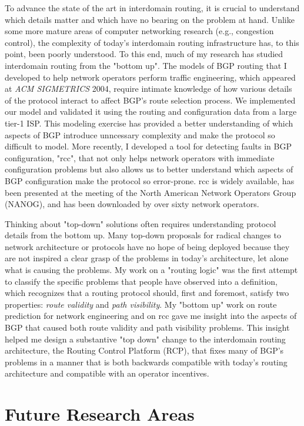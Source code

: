 \documentclass{article}
\begin{document}
To advance the state of the art in interdomain routing, it is crucial to
understand which details matter and which have no bearing on the problem
at hand.  Unlike some more mature areas of computer networking research
(e.g., congestion control), the complexity of today's interdomain
routing infrastructure has, to this point, been poorly understood.  To
this end, much of my research has studied interdomain routing from the
"bottom up".  The models of BGP routing that I developed to help network
operators perform traffic engineering, which appeared at {\em ACM
SIGMETRICS} 2004, require intimate knowledge of how various details of
the protocol interact to affect BGP's route selection process.  We
implemented our model and validated it using the routing and
configuration data from a large tier-1 ISP.  This modeling exercise has
provided a better understanding of which aspects of BGP introduce
unncessary complexity and make the protocol so difficult to model.  More
recently, I developed a tool for detecting faults in BGP configuration,
"rcc", that not only helps network operators with immediate
configuration problems but also allows us to better understand which
aspects of BGP configuration make the protocol so error-prone.  rcc is
widely available, has been presented at the meeting of the North
American Network Operators Group (NANOG), and has been downloaded by
over sixty network operators.

Thinking about "top-down" solutions often requires understanding
protocol details from the bottom up.  Many top-down proposals for
radical changes to network architecture or protocols have no hope of
being deployed because they are not inspired a clear grasp of the
problems in today's architecture, let alone what is causing the
problems.  My work on a "routing logic" was the first attempt to
classify the specific problems that people have observed into a
definition, which recognizes that a routing protocol should, first and
foremost, satisfy two properties: {\em route validity} and {\em path
visibility}.  My "bottom up" work on route prediction for network
engineering and on rcc gave me insight into the aspects of BGP that
caused both route validity and path visibility problems.  This insight
helped me design a substantive "top down" change to the interdomain
routing architecture, the Routing Control Platform (RCP), that fixes
many of BGP's problems in a manner that is both backwards compatible
with today's routing architecture and compatible with an operator
incentives.



\section*{Future Research Areas}
\end{document}
